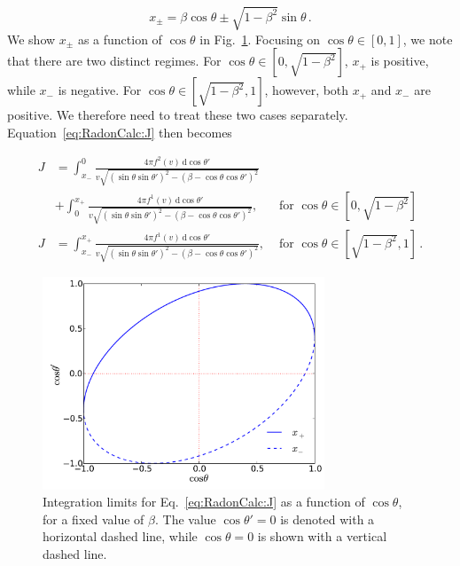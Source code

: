 \begin{equation}
x_{\pm} = \beta\cos\theta \pm \sqrt{1-\beta^2}\sin\theta\,.
\end{equation}
We show $x_{\pm}$ as a function of $\cos\theta$ in Fig.~\ref{fig:RadonCalc:IntegLimits}. Focusing on $\cos\theta \in [0,1]$, we note that there are two distinct regimes. For $\cos\theta \in [0, \sqrt{1-\beta^2}]$, $x_+$ is positive, while $x_-$ is negative. For $\cos\theta \in [\sqrt{1-\beta^2},1]$, however, both $x_+$ and $x_-$ are positive. We therefore need to treat these two cases separately. Equation~\ref{eq:RadonCalc:J} then becomes

\begin{align}
J &= \int_{x_-}^{0} \frac{4\pi f^2(v) \, \mathrm{d}\cos\theta'}{v\sqrt{\left(\sin\theta\sin\theta'\right)^2 - \left(\beta - \cos\theta\cos\theta'\right)^2}}  \\
& +\int_{0}^{x_+} \frac{4\pi f^1(v) \, \mathrm{d}\cos\theta'}{v\sqrt{\left(\sin\theta\sin\theta'\right)^2 - \left(\beta - \cos\theta\cos\theta'\right)^2}}, & \textrm{ for } \cos\theta \in [0,\sqrt{1-\beta^2}] \nonumber\\
J &= \int_{x_-}^{x_+} \frac{4\pi f^1(v) \, \mathrm{d}\cos\theta'}{v\sqrt{\left(\sin\theta\sin\theta'\right)^2 - \left(\beta - \cos\theta\cos\theta'\right)^2}}, & \textrm{ for } \cos\theta \in [\sqrt{1-\beta^2},1]\,.
\end{align}

\begin{figure}[tbh!]
  \centering
  \includegraphics[width=0.75\textwidth]{Directional/Integlimits.pdf}
\caption{Integration limits for Eq.~\ref{eq:RadonCalc:J} as a function of $\cos\theta$, for a fixed value of $\beta$. The value $\cos\theta' = 0$ is denoted with a horizontal dashed line, while $\cos\theta = 0$ is shown with a vertical dashed line.}
  \label{fig:RadonCalc:IntegLimits}
\end{figure}

